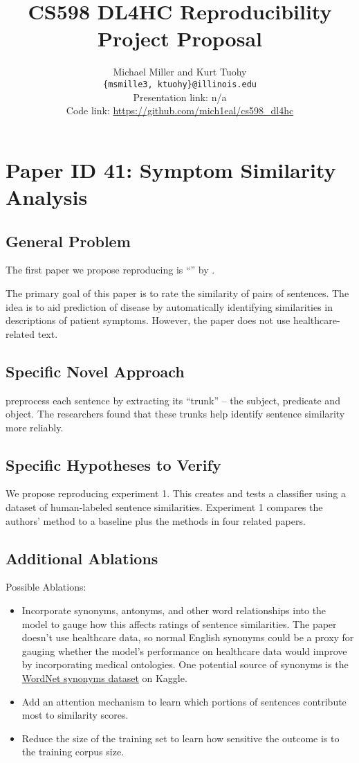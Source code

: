 \documentclass[11pt,a4paper]{article}
\title{CS598 DL4HC Reproducibility Project Proposal}
\author{Michael Miller and Kurt Tuohy \\
  \texttt{\{msmille3, ktuohy\}@illinois.edu}
  \\[2em]
  Presentation link: n/a\url{} \\
  Code link: \url{https://github.com/mich1eal/cs598_dl4hc}}
\begin{document}
\maketitle


\section{Paper ID 41: Symptom Similarity Analysis}
\subsection{General Problem}
The first paper we propose reproducing is ``'' by \citeauthor*{zhang_2019}.

The primary goal of this paper is to rate the similarity of pairs of sentences. The idea is to aid prediction of disease by automatically identifying similarities in descriptions of patient symptoms. However, the paper does not use healthcare-related text.

\subsection{Specific Novel Approach}
\citet{zhang_2019} preprocess each sentence by extracting its ``trunk'' -- the subject, predicate and object. The researchers found that these trunks help identify sentence similarity more reliably.

\subsection{Specific Hypotheses to Verify}
We propose reproducing experiment 1. This creates and tests a classifier using a dataset of human-labeled sentence similarities. Experiment 1 compares the authors' method to a baseline plus the methods in four related papers.

\subsection{Additional Ablations}
Possible Ablations:
\begin{itemize}
  \item Incorporate synonyms, antonyms, and other word relationships into the model to gauge how this affects ratings of sentence similarities. The paper doesn't use healthcare data, so normal English synonyms could be a proxy for gauging whether the model's performance on healthcare data would improve by incorporating medical ontologies. One potential source of synonyms is the \href{https://www.kaggle.com/datasets/duketemon/wordnet-synonyms}{WordNet synonyms dataset} on Kaggle.
  \item Add an attention mechanism to learn which portions of sentences contribute most to similarity scores.
  \item Reduce the size of the training set to learn how sensitive the outcome is to the training corpus size.
\end{itemize}
\end{document}
